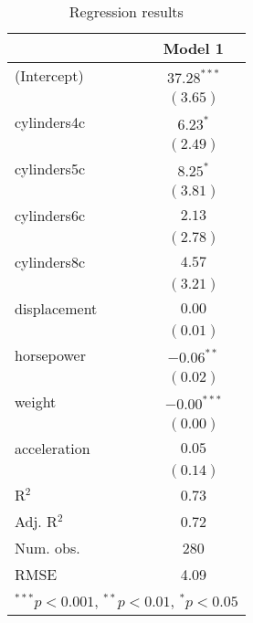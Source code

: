 \documentclass {article}
\begin{document}
\begin{table}
\caption{Regression results}
\begin{center}
\begin{tabular}{l c }
\hline
 & Model 1 \\
\hline
(Intercept)  & $37.28^{***}$ \\
             & $(3.65)$      \\
cylinders4c  & $6.23^{*}$    \\
             & $(2.49)$      \\
cylinders5c  & $8.25^{*}$    \\
             & $(3.81)$      \\
cylinders6c  & $2.13$        \\
             & $(2.78)$      \\
cylinders8c  & $4.57$        \\
             & $(3.21)$      \\
displacement & $0.00$        \\
             & $(0.01)$      \\
horsepower   & $-0.06^{**}$  \\
             & $(0.02)$      \\
weight       & $-0.00^{***}$ \\
             & $(0.00)$      \\
acceleration & $0.05$        \\
             & $(0.14)$      \\
\hline
R$^2$        & 0.73          \\
Adj. R$^2$   & 0.72          \\
Num. obs.    & 280           \\
RMSE         & 4.09          \\
\hline
\multicolumn{2}{l}{\scriptsize{$^{***}p<0.001$, $^{**}p<0.01$, $^*p<0.05$}}
\end{tabular}
\label{table:coefficients}
\end{center}
\end{table}
\end{document}

